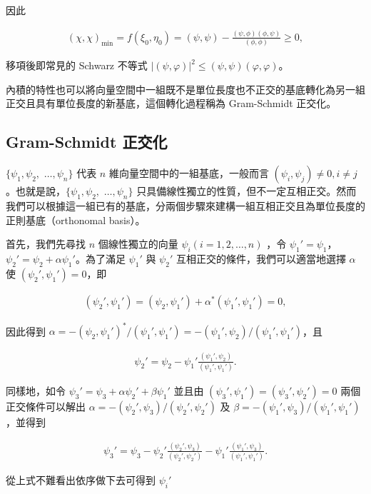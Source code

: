 因此

\begin{align}
(\chi, \chi)_{\mbox{min}}=f(\xi_0,\eta_0)=(\psi,\psi)-\frac{(\psi,\phi)(\phi,\psi)}{(\phi,\phi)}\geqslant 0,
\end{align}

移項後即常見的 Schwarz 不等式 $|(\psi,\varphi)|^2\leqslant (\psi, \psi)(\varphi, \varphi)$。

內積的特性也可以將向量空間中一組既不是單位長度也不正交的基底轉化為另一組正交且具有單位長度的新基底，這個轉化過程稱為 Gram-Schmidt 正交化。

\subsection{Gram-Schmidt 正交化}

$\{ \psi_1, \psi_2,$ $\ldots , \psi_n \}$  代表 $n$ 維向量空間中的一組基底，一般而言 $(\psi_i,\psi_j)\neq 0, i\neq j $。也就是說，$\{ \psi_1, \psi_2,$ $\ldots , \psi_n \}$ 只具備線性獨立的性質，但不一定互相正交。然而我們可以根據這一組已有的基底，分兩個步驟來建構一組互相正交且為單位長度的正則基底（orthonomal basis）。

首先，我們先尋找 $n$ 個線性獨立的向量 $\psi_i (i=1,2,\ldots, n)$ ，令 $ \psi_1'=\psi_1 $，$ \psi_2'=\psi_2+\alpha\psi_1' $。為了滿足 $ \psi_1' $ 與 $ \psi_2' $ 互相正交的條件，我們可以適當地選擇 $ \alpha $ 使 $ (\psi_2',\psi_1')=0 $，即


\begin{align}
(\psi_2',\psi_1')=(\psi_2,\psi_1')+\alpha^*(\psi_1',\psi_1')=0,
\end{align}

因此得到 $ \alpha=-(\psi_2,\psi_1')^*/(\psi_1',\psi_1')=-(\psi_1',\psi_2)/(\psi_1',\psi_1') $，且

\begin{align}
\psi_2'=\psi_2-\psi_1'\frac{(\psi_1',\psi_2)}{(\psi_1',\psi_1')}.
\end{align} 


同樣地，如令 $ \psi_3'=\psi_3+\alpha\psi_2'+\beta\psi_1' $ 並且由 $ (\psi_3',\psi_1')=(\psi_3',\psi_2')=0 $ 兩個正交條件可以解出 $ \alpha = -(\psi_2',\psi_3) / (\psi_2',\psi_2') $ 及 $ \beta = -(\psi_1',\psi_3)/ (\psi_1',\psi_1') $，並得到

\begin{align}
\psi_3'=\psi_3-\psi_2'\frac{(\psi_2',\psi_3)}{(\psi_2',\psi_2')}-\psi_1'\frac{(\psi_1',\psi_3)}{(\psi_1',\psi_1')}.
\end{align} 

從上式不難看出依序做下去可得到 $\psi_i'$ 

